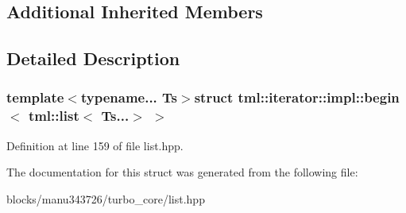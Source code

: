 \subsection*{Additional Inherited Members}


\subsection{Detailed Description}
\subsubsection*{template$<$typename... Ts$>$struct tml\+::iterator\+::impl\+::begin$<$ tml\+::list$<$ Ts...$>$ $>$}



Definition at line 159 of file list.\+hpp.



The documentation for this struct was generated from the following file\+:\begin{DoxyCompactItemize}
\item 
blocks/manu343726/turbo\+\_\+core/list.\+hpp\end{DoxyCompactItemize}
